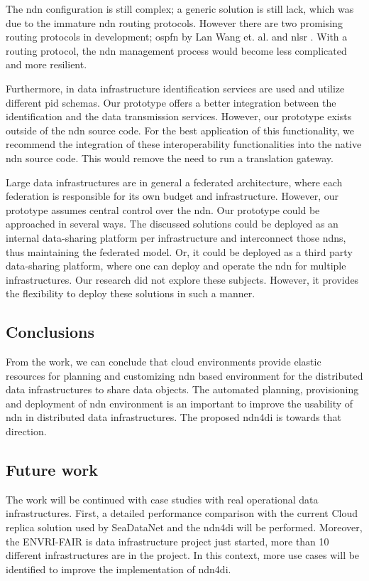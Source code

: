 \documentclass[conference]{IEEEtran}
\begin{document}
The \gls{ndn} configuration is still complex; a generic solution is still lack, which was due to the immature \gls{ndn} routing protocols. However there are two promising routing protocols in development; \gls{ospfn} by Lan Wang et. al. \cite{ndn-ospfn2} and \gls{nlsr} \cite{nlsr}. With a routing protocol, the \gls{ndn} management process would become less complicated and more resilient.

Furthermore, in data infrastructure identification services are used and utilize different \gls{pid} schemas. Our prototype offers a better integration between the identification and the data transmission services. However, our prototype exists outside of the \gls{ndn} source code. For the best application of this functionality, we recommend the integration of these interoperability functionalities into the native \gls{ndn} source code. This would remove the need to run a translation gateway.

Large data infrastructures are in general a federated architecture, where each federation is responsible for its own budget and infrastructure. However, our prototype assumes central control over the \gls{ndn}. Our prototype could be approached in several ways. The discussed solutions could be deployed as an internal data-sharing platform per infrastructure and interconnect those \glspl{ndn}, thus maintaining the federated model. Or, it could be deployed as a third party data-sharing platform, where one can deploy and operate the \gls{ndn} for multiple infrastructures. Our research did not explore these subjects. However, it provides the flexibility to deploy these solutions in such a manner.
\subsection{Conclusions}
From the work, we can conclude that cloud environments provide elastic resources for planning and customizing \gls{ndn} based environment for the distributed data infrastructures to share data objects. The automated planning, provisioning and deployment of \gls{ndn} environment is an important to improve the usability of \gls{ndn} in distributed data infrastructures. The proposed \gls{ndn4di} is towards that direction. 

\subsection{Future work}
The work will be continued with case studies with real operational data infrastructures. First, a detailed performance comparison with the current Cloud replica solution used by SeaDataNet and the \gls{ndn4di} will be performed. Moreover, the ENVRI-FAIR is data infrastructure project just started, more than 10 different infrastructures are in the project. In this context, more use cases will be identified to improve the implementation of \gls{ndn4di}.  
\end{document}

